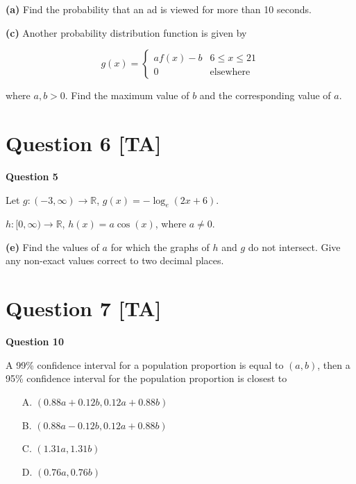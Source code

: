 \documentclass[10pt,a4paper]{article}
\begin{document}
\textbf{(a)} Find the probability that an ad is viewed for more than 10 seconds.

\vspace{9\baselineskip}

\textbf{(c)} Another probability distribution function is given by

\[
g(x) = \begin{cases}
af(x) - b & 6 \leq x \leq 21 \\
0 & \text{elsewhere}
\end{cases}
\]

where $a, b > 0$. Find the maximum value of $b$ and the corresponding value of $a$.

\vspace{9\baselineskip}

\hrulefill

\section*{Question 6 [TA]}

\textbf{Question 5}

Let $g : (-3,\infty) \to \mathbb{R}$, $g(x) = -\log_e(2x + 6)$.

$h : [0,\infty) \to \mathbb{R}$, $h(x) = a\cos(x)$, where $a \neq 0$.

\textbf{(e)} Find the values of $a$ for which the graphs of $h$ and $g$ do not intersect. Give any non-exact values correct to two decimal places.

\vspace{9\baselineskip}

\hrulefill

\section*{Question 7 [TA]}

\textbf{Question 10}

A 99\% confidence interval for a population proportion is equal to $(a,b)$, then a 95\% confidence interval for the population proportion is closest to

\begin{enumerate}
    \item[A.] $(0.88a + 0.12b, 0.12a + 0.88b)$
    \item[B.] $(0.88a - 0.12b, 0.12a + 0.88b)$
    \item[C.] $(1.31a, 1.31b)$
    \item[D.] $(0.76a, 0.76b)$
\end{enumerate}
\end{document}
